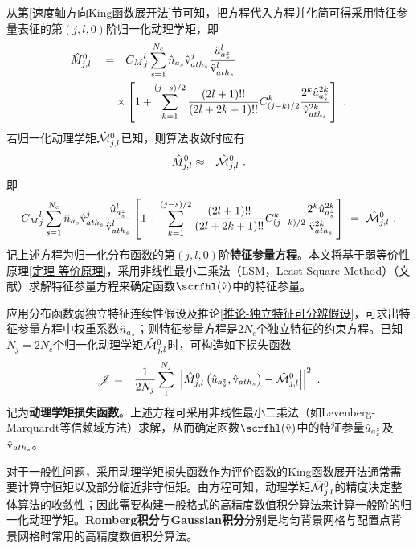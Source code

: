 从第\ref{速度轴方向King函数展开法}节可知，把方程代入方程并化简可得采用特征参量表征的第$(j,l,0)$阶归一化动理学矩，即
\begin{eqnarray}
\begin{aligned}
      {{\hat{M}}}_{j,l}^0 \quad = \quad & {C_M}_j^l \sum_{s=1}^{N_c} \hat{n}_{a_s} \hat{\mathrm{v}}_{{ath}_s}^j \frac{ {\hat{u}}_{a_s^z}^l}{\hat{\mathrm{v}}_{{ath}_s}^l} 
      \\
      \times & \left [1 + \sum_{k=1}^{(j-s)/2} \frac{(2 l + 1)!!}{(2 l + 2 k + 1)!!} C_{(j-k)/2}^k \frac{2^k {\hat{u}}_{a_s^z}^{2k}}{\hat{\mathrm{v}}_{{ath}_s}^{2k}} \right]~. \label{MhKjl0s}
\end{aligned}
\end{eqnarray}
若归一化动理学矩${\hat{\mathcal{M}}}{_{j,l}^0}$已知，则算法收敛时应有
\begin{eqnarray}
      {\hat{M}}_{j,l}^0 & \approx & {\hat{\mathcal{M}}}{_{j,l}^0} ~.
\end{eqnarray}
即
\begin{eqnarray}
      {C_M}_j^l \sum_{s=1}^{N_c} \hat{n}_{a_s} \hat{\mathrm{v}}_{{ath}_s}^j \frac{ {\hat{u}}_{a_s^z}^l}{\hat{\mathrm{v}}_{{ath}_s}^l}  \left [1 + \sum_{k=1}^{(j-s)/2} \frac{(2 l + 1)!!}{(2 l + 2 k + 1)!!} C_{(j-k)/2}^k \frac{2^k {\hat{u}}_{a_s^z}^{2k}}{\hat{\mathrm{v}}_{{ath}_s}^{2k}} \right] \ = \ {\hat{\mathcal{M}}}{_{j,l}^0} ~. \label{nuThsMhjl}
\end{eqnarray}
记上述方程为归一化分布函数的第$(j,l,0)$阶\textbf{特征参量方程}。本文将基于弱等价性原理\ref{定理-等价原理}，采用非线性最小二乘法（LSM，Least Square Method）（文献）求解特征参量方程来确定函数$\scrfhl (\rmvh)$中的特征参量。

应用分布函数弱独立特征连续性假设及推论\ref{推论-独立特征可分辨假设}，可求出特征参量方程中权重系数$\hat{n}_{a_s}$；则特征参量方程是$2N_c$个独立特征的约束方程。已知$N_j=2N_c$个归一化动理学矩${\hat{\mathcal{M}}}{_{j,l}^0}$时，可构造如下损失函数
\begin{eqnarray}
      \mathscr{J} & = & \frac{1}{2N_j} \sum_1^{N_j} \left| \left| {\hat{M}}_{j,l}^0 \left({\hat{u}}_{a_s^z}, \hat{\mathrm{v}}_{{ath}_s} \right) - {\hat{\mathcal{M}}}{_{j,l}^0} \right| \right|^2 ~. \label{MhjlMhjl0}
\end{eqnarray}
记为\textbf{动理学矩损失函数}。上述方程可采用非线性最小二乘法（如Levenberg-Marquardt等信赖域方法）求解，从而确定函数$\scrfhl (\rmvh)$中的特征参量${\hat{u}}_{a_s^z}$及$\hat{\mathrm{v}}_{{ath}_s}$。

对于一般性问题，采用动理学矩损失函数作为评价函数的King函数展开法通常需要计算守恒矩以及部分临近非守恒矩。由方程可知，动理学矩${\hat{\mathcal{M}}}{_{j,l}^0}$的精度决定整体算法的收敛性；因此需要构建一般格式的高精度数值积分算法来计算一般阶的归一化动理学矩。\textbf{Romberg积分}与\textbf{Gaussian积分}分别是均匀背景网格与配置点背景网格时常用的高精度数值积分算法。

